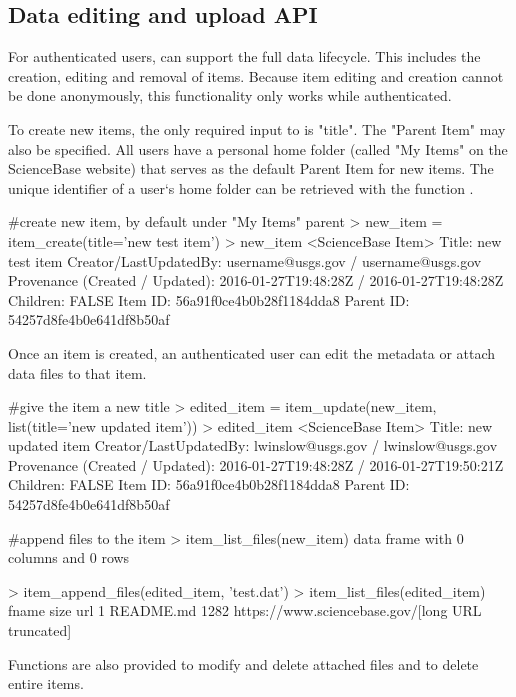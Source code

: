 \subsection{Data editing and upload API}
For authenticated users,  can support
the full data lifecycle. This includes the creation, editing and removal
of items. Because item editing and creation cannot be done anonymously,
this functionality only works while authenticated.

To create new items, the only required input to  is "title".
The "Parent Item" may also be specified. All users have a personal home folder
(called "My Items" on the ScienceBase website) that serves as the default Parent
Item for new items. The unique identifier of a user`s home folder can be
retrieved with the function .

\begin{example}
#create new item, by default under "My Items" parent
> new_item = item_create(title='new test item')
> new_item
<ScienceBase Item>
  Title: new test item
  Creator/LastUpdatedBy:     username@usgs.gov / username@usgs.gov
  Provenance (Created / Updated):  2016-01-27T19:48:28Z / 2016-01-27T19:48:28Z
  Children: FALSE
  Item ID: 56a91f0ce4b0b28f1184dda8
  Parent ID: 54257d8fe4b0e641df8b50af
\end{example}

Once an item is created, an authenticated user can edit the metadata or attach
data files to that item.

\begin{example}
#give the item a new title
> edited_item = item_update(new_item, list(title='new updated item'))
> edited_item
<ScienceBase Item>
  Title: new updated item
  Creator/LastUpdatedBy:     lwinslow@usgs.gov / lwinslow@usgs.gov
  Provenance (Created / Updated):  2016-01-27T19:48:28Z / 2016-01-27T19:50:21Z
  Children: FALSE
  Item ID: 56a91f0ce4b0b28f1184dda8
  Parent ID: 54257d8fe4b0e641df8b50af

#append files to the item
> item_list_files(new_item)
data frame with 0 columns and 0 rows

> item_append_files(edited_item, 'test.dat')
> item_list_files(edited_item)
      fname size     url
1 README.md 1282     https://www.sciencebase.gov/[long URL truncated]
\end{example}

Functions are also provided to modify and delete attached files and to delete
entire items.

